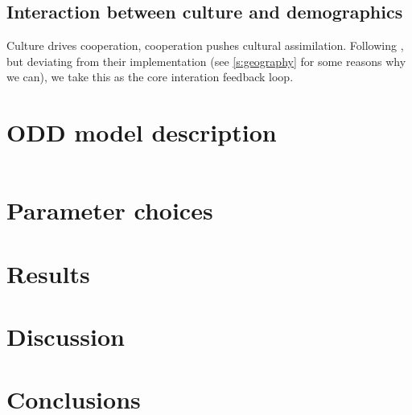 \documentclass[a4paper,12pt]{scrartcl}
\begin{document}
\subsection{Interaction between culture and demographics}
\label{s:interaction}

Culture drives cooperation, cooperation pushes cultural assimilation. Following
\parencite{barcelo2014social,barcelo2015simulating}, but deviating from their
implementation (see \cref{s:geography} for some reasons why we can), we take this
as the core interation feedback loop.

\section{ODD model description}
\label{s:odd}

\inputminted{rust}{supplement/dispersal_model_rust/src/main.rs}

\section{Parameter choices}
\label{s:parameters}
\section{Results}
\label{s:results}
\section{Discussion}
\label{s:discussion}
\section{Conclusions}
\label{s:conclusions}

\printbibliography
\end{document}
